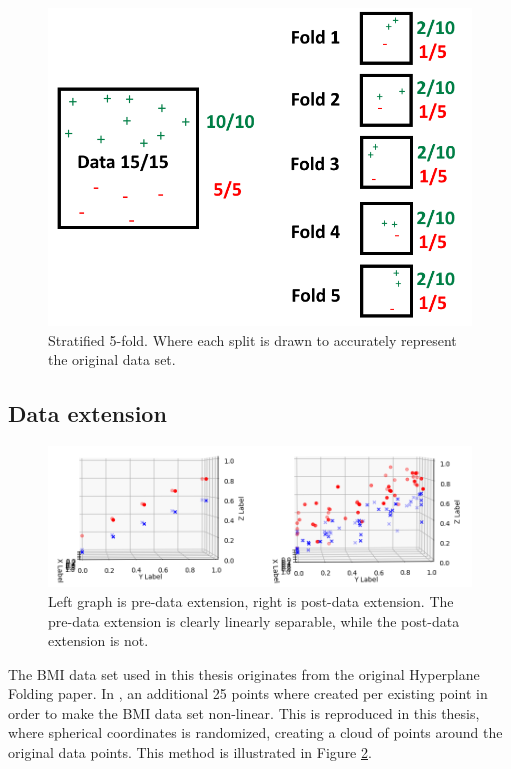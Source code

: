 \documentclass[a4paper,twoside]{bth}
\begin{document}
\begin{figure}
\centering
\includegraphics[scale=0.65]{images/metod-images/kfold_stratified_fold.png}
   \caption{Stratified 5-fold. Where each split is drawn to accurately represent the original data set.}
   \label{fig:stratkfold}
\end{figure}

\subsection{Data extension}
\label{data extension}
\begin{figure}
\centering
\includegraphics[scale=0.75]{images/metod-images/extend.png}
   \caption{Left graph is pre-data extension, right is post-data extension. The pre-data extension is clearly linearly separable, while the post-data extension is not. }
   \label{fig:extend}
\end{figure}

The BMI data set used in this thesis originates from the original Hyperplane Folding paper. In \cite{unpublished}, an additional 25 points where created per existing point in order to make the BMI data set non-linear. This is reproduced in this thesis, where spherical coordinates is randomized, creating a cloud of points around the original data points. This method is illustrated in Figure \ref{fig:extend}.
\end{document}
